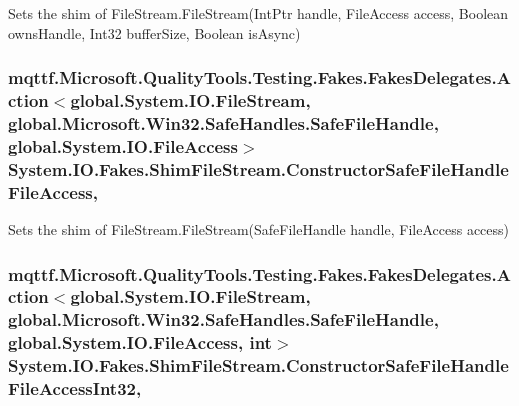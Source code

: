 Sets the shim of File\-Stream.\-File\-Stream(\-Int\-Ptr handle, File\-Access access, Boolean owns\-Handle, Int32 buffer\-Size, Boolean is\-Async)

\hypertarget{class_system_1_1_i_o_1_1_fakes_1_1_shim_file_stream_a132e162e7c4091e0b866849bc370b895}{
\subsubsection[{Constructor\-Safe\-File\-Handle\-File\-Access}]{\setlength{\rightskip}{0pt plus 5cm}mqttf.\-Microsoft.\-Quality\-Tools.\-Testing.\-Fakes.\-Fakes\-Delegates.\-Action$<$global.\-System.\-I\-O.\-File\-Stream, global.\-Microsoft.\-Win32.\-Safe\-Handles.\-Safe\-File\-Handle, global.\-System.\-I\-O.\-File\-Access$>$ System.\-I\-O.\-Fakes.\-Shim\-File\-Stream.\-Constructor\-Safe\-File\-Handle\-File\-Access\hspace{0.3cm}{\ttfamily [static]}, {\ttfamily [set]}}}\label{class_system_1_1_i_o_1_1_fakes_1_1_shim_file_stream_a132e162e7c4091e0b866849bc370b895}


Sets the shim of File\-Stream.\-File\-Stream(\-Safe\-File\-Handle handle, File\-Access access)

\hypertarget{class_system_1_1_i_o_1_1_fakes_1_1_shim_file_stream_a4400df0b3883247858c96a5e27225d00}{
\subsubsection[{Constructor\-Safe\-File\-Handle\-File\-Access\-Int32}]{\setlength{\rightskip}{0pt plus 5cm}mqttf.\-Microsoft.\-Quality\-Tools.\-Testing.\-Fakes.\-Fakes\-Delegates.\-Action$<$global.\-System.\-I\-O.\-File\-Stream, global.\-Microsoft.\-Win32.\-Safe\-Handles.\-Safe\-File\-Handle, global.\-System.\-I\-O.\-File\-Access, int$>$ System.\-I\-O.\-Fakes.\-Shim\-File\-Stream.\-Constructor\-Safe\-File\-Handle\-File\-Access\-Int32\hspace{0.3cm}{\ttfamily [static]}, {\ttfamily [set]}}}\label{class_system_1_1_i_o_1_1_fakes_1_1_shim_file_stream_a4400df0b3883247858c96a5e27225d00}


